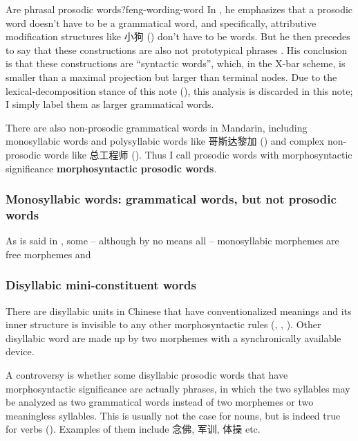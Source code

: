 \documentclass[UTF8, a4paper, oneside, scheme=plain]{ctexrep}
\newcommand*{\citepages}[1]{pp.~{#1}}
\newcommand*{\concept}[1]{\textbf{#1}}
\begin{document}
\begin{infobox}{Are phrasal prosodic words?}{feng-wording-word}
    In \citet[\citepages{84-85}]{feng2000}, he emphasizes that 
    a prosodic word doesn't have to be a grammatical word,
    and specifically, attributive modification structures like 小狗 
    ()
    don't have to be words.
    But he then precedes to say 
    that these constructions are also not prototypical phrases
    \citep[\citepages{85-86}]{feng2000}.
    His conclusion is that these constructions 
    are ``syntactic words'',
    which, in the X-bar scheme, 
    is smaller than a maximal projection but larger than terminal nodes.
    Due to the lexical-decomposition stance of this note 
    (),
    this analysis is discarded in this note;
    I simply label them as larger grammatical words.
\end{infobox}

There are also non-prosodic grammatical words in Mandarin,
including monosyllabic words and polysyllabic words like 哥斯达黎加 
()
and complex non-prosodic words like 
总工程师 ().
Thus I call prosodic words with morphosyntactic significance \concept{morphosyntactic prosodic words}.

\subsubsection{Monosyllabic words: grammatical words, but not prosodic words}\label{sec:pos.word.monosyllabic}

As is said in , 
some -- although by no means all -- monosyllabic morphemes 
are free morphemes and

\subsubsection{Disyllabic mini-constituent words}\label{sec:pos.architecture.word.mini-constituent}

There are disyllabic units in Chinese 
that have conventionalized meanings and its inner structure is invisible 
to any other morphosyntactic rules 
(,
,
).
Other disyllabic word are made up by two morphemes with a synchronically available device.

A controversy is whether some disyllabic prosodic words that have morphosyntactic significance
are actually phrases,
in which the two syllables may be analyzed 
as two grammatical words
instead of two morphemes or two meaningless syllables.
This is usually not the case for nouns, 
but is indeed true for verbs
().
Examples of them include 念佛, 军训, 体操 etc. 
\end{document}
